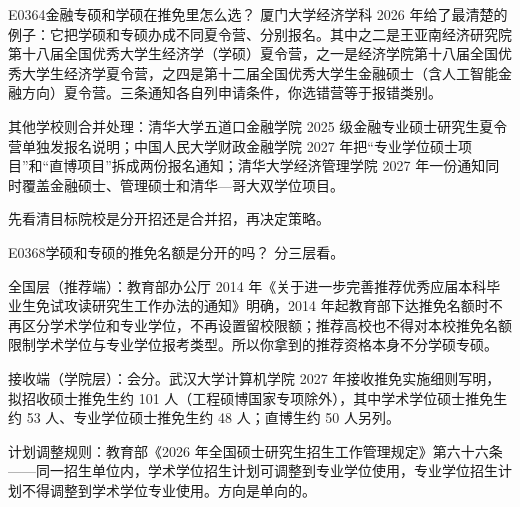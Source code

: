 \begin{qa}{E0364}{金融专硕和学硕在推免里怎么选？}
厦门大学经济学科 2026 年给了最清楚的例子：它把学硕和专硕办成不同夏令营、分别报名。其中之二是王亚南经济研究院第十八届全国优秀大学生经济学（学硕）夏令营，之一是经济学院第十八届全国优秀大学生经济学夏令营，之四是第十二届全国优秀大学生金融硕士（含人工智能金融方向）夏令营。三条通知各自列申请条件，你选错营等于报错类别。

其他学校则合并处理：清华大学五道口金融学院 2025 级金融专业硕士研究生夏令营单独发报名说明；中国人民大学财政金融学院 2027 年把“专业学位硕士项目”和“直博项目”拆成两份报名通知；清华大学经济管理学院 2027 年一份通知同时覆盖金融硕士、管理硕士和清华—哥大双学位项目。

先看清目标院校是分开招还是合并招，再决定策略。
\end{qa}

\begin{qa}{E0368}{学硕和专硕的推免名额是分开的吗？}
分三层看。

全国层（推荐端）：教育部办公厅 2014 年《关于进一步完善推荐优秀应届本科毕业生免试攻读研究生工作办法的通知》明确，2014 年起教育部下达推免名额时不再区分学术学位和专业学位，不再设置留校限额；推荐高校也不得对本校推免名额限制学术学位与专业学位报考类型。所以你拿到的推荐资格本身不分学硕专硕。

接收端（学院层）：会分。武汉大学计算机学院 2027 年接收推免实施细则写明，拟招收硕士推免生约 101 人（工程硕博国家专项除外），其中学术学位硕士推免生约 53 人、专业学位硕士推免生约 48 人；直博生约 50 人另列。

计划调整规则：教育部《2026 年全国硕士研究生招生工作管理规定》第六十六条——同一招生单位内，学术学位招生计划可调整到专业学位使用，专业学位招生计划不得调整到学术学位专业使用。方向是单向的。
\end{qa}

